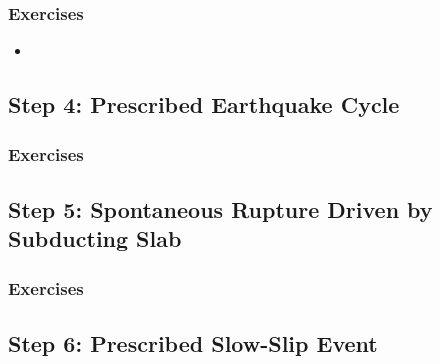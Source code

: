 \subsubsection{Exercises}

\begin{itemize}
\item 
\end{itemize}


\subsection{Step 4: Prescribed Earthquake Cycle}

\subsubsection{Exercises}




\subsection{Step 5: Spontaneous Rupture Driven by Subducting Slab}

\subsubsection{Exercises}

\subsection{Step 6: Prescribed Slow-Slip Event}


